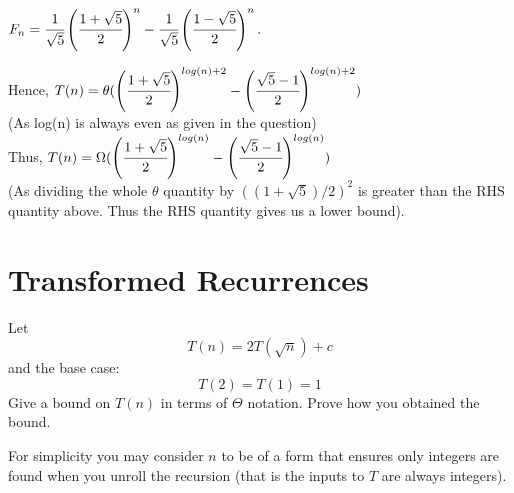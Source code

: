 \documentclass[a4paper,10pt]{article}
\newenvironment{answer}[1][height fill] {
    \begin{tcolorbox}[#1]
}
{
    \end{tcolorbox}
}
\begin{document}
\begin{answer}
        ${\displaystyle F_{n}={\cfrac {1}{\sqrt {5}}}\left({\cfrac {1+{\sqrt {5}}}{2}}\right)^{n}-{\cfrac {1}{\sqrt {5}}}\left({\cfrac {1-{\sqrt {5}}}{2}}\right)^{n}.}$
        
        Hence, $T(n)= \theta(\left({\cfrac {1+{\sqrt {5}}}{2}}\right)^{log(n)+2}-\left({\cfrac {{\sqrt {5}}-1}{2}}\right)^{log(n)+2})$\\
        (As log(n) is always even as given in the question)\\
        Thus,
        $T(n)= \Omega(\left({\cfrac {1+{\sqrt {5}}}{2}}\right)^{log(n)}-\left({\cfrac {{\sqrt {5}}-1}{2}}\right)^{log(n)})$\\(As dividing the whole $\theta$ quantity by $((1+\sqrt{5})/2)^2$  is greater than the RHS quantity above. Thus the RHS quantity gives us a lower bound).
        
        
        
\end{answer}



\section{Transformed Recurrences}
Let 
$$T(n) = 2T(\sqrt{n}) + c$$
and the base case:
$$T(2) = T(1) = 1$$
Give a bound on $T(n)$ in terms of $\Theta$ notation. Prove how you obtained the bound.

For simplicity you may consider $n$ to be of a form that ensures only integers are found when you unroll the recursion (that is the inputs to $T$ are always integers).
\end{document}
